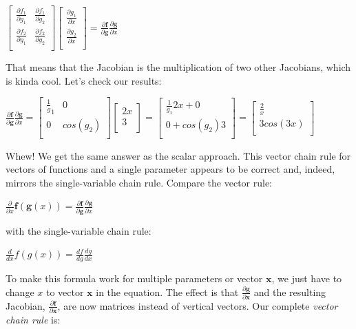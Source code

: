 \documentclass[11pt]{article}
\begin{document}
$
\begin{bmatrix}
	\frac{\partial f_1}{\partial g_1} & \frac{\partial f_1}{\partial g_2}\\
	\frac{\partial f_2}{\partial g_1} & \frac{\partial f_2}{\partial g_2}\\
\end{bmatrix}\begin{bmatrix}
\frac{\partial g_1}{\partial x}\\
\frac{\partial g_2}{\partial x}\\
\end{bmatrix} = \frac{\partial \mathbf{f}}{\partial \mathbf{g}}\frac{\partial \mathbf{g}}{\partial x}
$

That means that the Jacobian is the multiplication of two other Jacobians, which is kinda cool.  Let's check our results:

$
\frac{\partial \mathbf{f}}{\partial \mathbf{g}}\frac{\partial \mathbf{g}}{\partial x} = \begin{bmatrix}
	\frac{1}g_1 & 0\\
	0 & cos(g_2)\\
\end{bmatrix}\begin{bmatrix}
2x\\
3\\
\end{bmatrix} = \begin{bmatrix}
	\frac{1}{g_1}2x + 0\\
	0 + cos(g_2)3\\
\end{bmatrix} = \begin{bmatrix}
	\frac{2}{x}\\
	3cos(3x)\\
\end{bmatrix}
$

Whew!  We get the same answer as the scalar approach. This vector chain rule for vectors of functions and a single parameter appears to be correct and, indeed, mirrors the single-variable chain rule. Compare the vector rule:

$\frac{\partial}{\partial x} \mathbf{f}(\mathbf{g}(x)) = \frac{\partial \mathbf{f}}{\partial \mathbf{g}}\frac{\partial\mathbf{g}}{\partial x}$

with the single-variable chain rule:

$\frac{d}{dx} f(g(x)) = \frac{df}{dg}\frac{dg}{dx}$

To make this formula work for multiple parameters or vector $\mathbf{x}$, we just have to change $x$ to vector $\mathbf{x}$ in the equation.  The effect is  that $\frac{\partial\mathbf{g}}{\partial \mathbf{x}}$ and the resulting Jacobian,  $\frac{\partial \mathbf{f}}{\partial \mathbf{x}}$, are now matrices instead of  vertical vectors. Our complete {\em vector chain rule} is:
\end{document}

